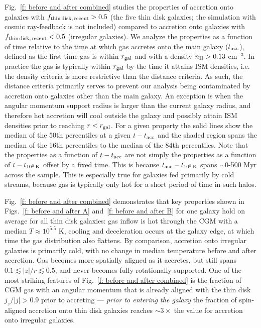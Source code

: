 \documentclass[fleqn,usenatbib]{mnras}
\newcommand{\fthin}{f_{\rm thin\,disk,\,recent}}
\newcommand{\tcools}{t_{10^5\,{\rm K}}}
\newcommand{\tacc}{t_{\rm acc}}
\begin{document}
Fig.~\ref{f: before and after combined} studies the properties of accretion onto galaxies with $\fthin > 0.5$ (the five thin disk galaxies; the simulation with cosmic ray-feedback is not included) compared to accretion onto galaxies with $\fthin < 0.5$ (irregular galaxies).
We analyze the properties as a function of time relative to the time at which gas accretes onto the main galaxy ($\tacc$), defined as the first time gas is within $r_{\rm gal}$ and with a density $n_{\rm H} > 0.13$ cm$^{-3}$.
In practice the gas is typically within $r_{\rm gal}$ by the time it attains ISM densities, i.e. the density criteria is more restrictive than the distance criteria.
As such, the distance criteria primarily serves to prevent our analysis being contaminated by accretion onto galaxies other than the main galaxy.
An exception is when the angular momentum support radius is larger than the current galaxy radius, and therefore hot accretion will cool outside the galaxy and possibly attain ISM densities prior to reaching $r < r_{\rm gal}$.
For a given property the solid lines show the median of the 50th percentiles at a given $t - \tacc$ and the shaded region spans the median of the 16th percentiles to the median of the 84th percentiles.
Note that the properties as a function of $t - \tacc$ are not simply the properties as a function of $t - \tcools$ offset by a fixed time.
This is because $\tacc - \tcools$ spans ${\sim}$0-500 Myr across the sample.
This is especially true for galaxies fed primarily by cold streams, because gas is typically only hot for a short period of time in such halos.

Fig.~\ref{f: before and after combined} demonstrates that key properties shown in Figs.~\ref{f: before and after A} and~\ref{f: before and after B} for one galaxy hold on average for all thin disk galaxies:
gas inflow is hot through the CGM with a median $T \approx 10^{5.5}$ K,
cooling and deceleration occurs at the galaxy edge,
at which time the gas distribution also flattens.
By comparison, accretion onto irregular galaxies is primarily cold, with no change in median temperature before and after accretion.
Gas becomes more spatially aligned as it accretes, but still spans $0.1 \lesssim \vert z \vert / r \lesssim 0.5$, and never becomes fully rotationally supported.
One of the most striking features of Fig.~\ref{f: before and after combined} is the fraction of CGM gas with an angular momentum that is already aligned with the thin disk $j_z/\vert j \vert > 0.9$ prior to accreting --- \textit{prior to entering the galaxy} the fraction of spin-aligned accretion onto thin disk galaxies reaches ${\sim} 3 \times$ the value for accretion onto irregular galaxies.
\end{document}
